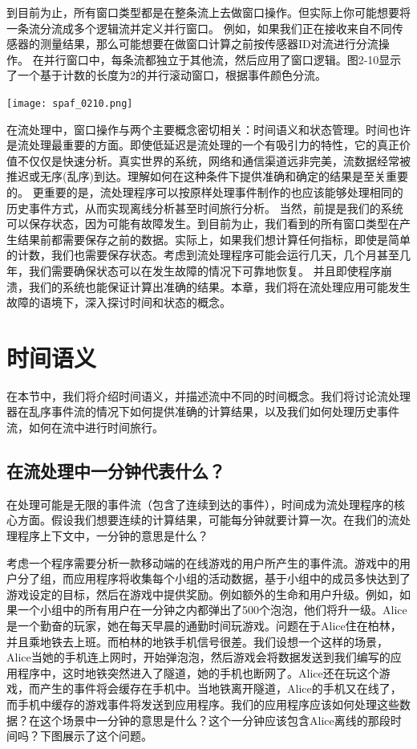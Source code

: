 \documentclass[oneside]{ctexbook}
\begin{document}
到目前为止，所有窗口类型都是在整条流上去做窗口操作。但实际上你可能想要将一条流分流成多个逻辑流并定义并行窗口。
例如，如果我们正在接收来自不同传感器的测量结果，那么可能想要在做窗口计算之前按传感器ID对流进行分流操作。
在并行窗口中，每条流都独立于其他流，然后应用了窗口逻辑。图2-10显示了一个基于计数的长度为2的并行滚动窗口，根据事件颜色分流。

\noindent\texttt{[image: spaf\_0210.png]}

在流处理中，窗口操作与两个主要概念密切相关：时间语义和状态管理。时间也许是流处理最重要的方面。即使低延迟是流处理的一个有吸引力的特性，它的真正价值不仅仅是快速分析。真实世界的系统，网络和通信渠道远非完美，流数据经常被推迟或无序(乱序)到达。理解如何在这种条件下提供准确和确定的结果是至关重要的。
更重要的是，流处理程序可以按原样处理事件制作的也应该能够处理相同的历史事件方式，从而实现离线分析甚至时间旅行分析。
当然，前提是我们的系统可以保存状态，因为可能有故障发生。到目前为止，我们看到的所有窗口类型在产生结果前都需要保存之前的数据。实际上，如果我们想计算任何指标，即使是简单的计数，我们也需要保存状态。考虑到流处理程序可能会运行几天，几个月甚至几年，我们需要确保状态可以在发生故障的情况下可靠地恢复。
并且即使程序崩溃，我们的系统也能保证计算出准确的结果。本章，我们将在流处理应用可能发生故障的语境下，深入探讨时间和状态的概念。

\section{时间语义}

在本节中，我们将介绍时间语义，并描述流中不同的时间概念。我们将讨论流处理器在乱序事件流的情况下如何提供准确的计算结果，以及我们如何处理历史事件流，如何在流中进行时间旅行。

\subsection{在流处理中一分钟代表什么？}

在处理可能是无限的事件流（包含了连续到达的事件），时间成为流处理程序的核心方面。假设我们想要连续的计算结果，可能每分钟就要计算一次。在我们的流处理程序上下文中，一分钟的意思是什么？

考虑一个程序需要分析一款移动端的在线游戏的用户所产生的事件流。游戏中的用户分了组，而应用程序将收集每个小组的活动数据，基于小组中的成员多快达到了游戏设定的目标，然后在游戏中提供奖励。例如额外的生命和用户升级。例如，如果一个小组中的所有用户在一分钟之内都弹出了500个泡泡，他们将升一级。Alice是一个勤奋的玩家，她在每天早晨的通勤时间玩游戏。问题在于Alice住在柏林，并且乘地铁去上班。而柏林的地铁手机信号很差。我们设想一个这样的场景，Alice当她的手机连上网时，开始弹泡泡，然后游戏会将数据发送到我们编写的应用程序中，这时地铁突然进入了隧道，她的手机也断网了。Alice还在玩这个游戏，而产生的事件将会缓存在手机中。当地铁离开隧道，Alice的手机又在线了，而手机中缓存的游戏事件将发送到应用程序。我们的应用程序应该如何处理这些数据？在这个场景中一分钟的意思是什么？这个一分钟应该包含Alice离线的那段时间吗？下图展示了这个问题。
\end{document}
